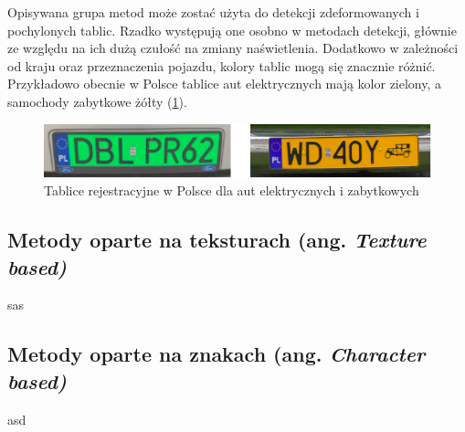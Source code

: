 Opisywana grupa metod może zostać użyta do detekcji zdeformowanych i pochylonych tablic.
Rzadko występują one osobno w metodach detekcji, głównie ze względu na ich dużą czułość na zmiany naświetlenia.
Dodatkowo w zależności od kraju oraz przeznaczenia pojazdu, kolory tablic mogą się znacznie różnić.
Przykładowo obecnie w Polsce tablice aut elektrycznych mają kolor zielony, a samochody zabytkowe żółty (\ref{fig:tablice}).
\FloatBarrier
\begin{figure}[!ht]
    \centering
    \includegraphics[scale=0.6]{Pictures/tablice}
    \caption{Tablice rejestracyjne w Polsce dla aut elektrycznych i zabytkowych}
    \label{fig:tablice}
\end{figure}
\FloatBarrier

\subsection{Metody oparte na teksturach (ang. \textit{Texture based)}}
sas

\subsection{Metody oparte na znakach (ang. \textit{Character based)}}
asd



